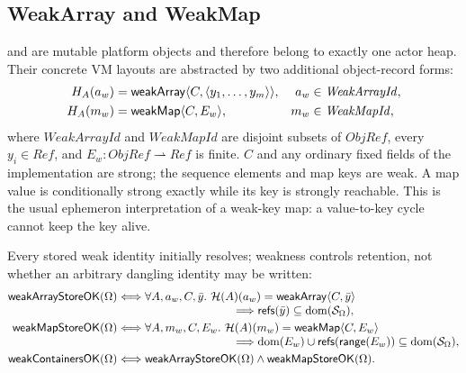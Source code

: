 \subsection{WeakArray and WeakMap}
\label{sec:weak-containers}

 and  are mutable platform objects and therefore
belong to exactly one actor heap.  Their concrete VM layouts are abstracted by
two additional object-record forms:
\begin{equation}\label{eq:weak-container-records}
\begin{aligned}
 H_A(a_w)&=\mathsf{weakArray}\langle C,\langle y_1,\ldots,y_m\rangle\rangle,
   &a_w&\in\mathit{WeakArrayId},\\
 H_A(m_w)&=\mathsf{weakMap}\langle C,E_w\rangle,
   &m_w&\in\mathit{WeakMapId},
\end{aligned}
\end{equation}
where $\mathit{WeakArrayId}$ and $\mathit{WeakMapId}$ are disjoint subsets of
$\mathit{ObjRef}$, every $y_i\in\mathit{Ref}$, and
$E_w:\mathit{ObjRef}\rightharpoonup\mathit{Ref}$ is finite.  $C$ and any
ordinary fixed fields of the implementation are strong; the sequence elements
and map keys are weak.  A map value is conditionally strong exactly while its
key is strongly reachable.  This is the usual ephemeron interpretation of a
weak-key map: a value-to-key cycle cannot keep the key alive.

Every stored weak identity initially resolves; weakness controls retention, not
whether an arbitrary dangling identity may be written:
\begin{equation}\label{eq:weak-container-validity}
\begin{aligned}
 \mathsf{weakArrayStoreOK}(\Omega)
 &\Longleftrightarrow
   \forall A,a_w,C,\bar y.\
     \mathcal H(A)(a_w)=\kw{weakArray}\langle C,\bar y\rangle\\[-1mm]
 &\hspace{35mm}\Longrightarrow
     \mathsf{refs}(\bar y)\subseteq\dom(\mathcal S_\Omega),\\
 \mathsf{weakMapStoreOK}(\Omega)
 &\Longleftrightarrow
   \forall A,m_w,C,E_w.\
     \mathcal H(A)(m_w)=\kw{weakMap}\langle C,E_w\rangle\\[-1mm]
 &\hspace{35mm}\Longrightarrow
     \dom(E_w)\cup\mathsf{refs}(\mathsf{range}(E_w))
       \subseteq\dom(\mathcal S_\Omega),\\
 \mathsf{weakContainersOK}(\Omega)
 &\Longleftrightarrow
   \mathsf{weakArrayStoreOK}(\Omega)\land\mathsf{weakMapStoreOK}(\Omega).
\end{aligned}
\end{equation}

